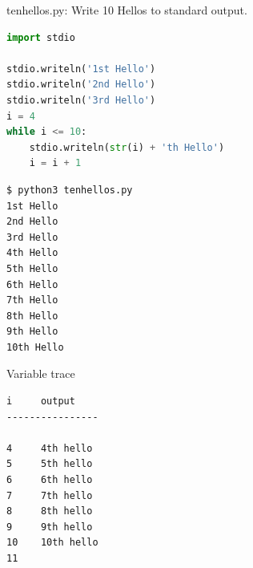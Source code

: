 \documentclass[8pt,a4paper,compress]{beamer}
\begin{document}
\begin{frame}[fragile]
\pause

\begin{framed}
\tiny tenhellos.py: Write 10 Hellos to standard output.
\end{framed}

\begin{lstlisting}[language=Python]
import stdio

stdio.writeln('1st Hello')
stdio.writeln('2nd Hello')
stdio.writeln('3rd Hello')
i = 4
while i <= 10:
    stdio.writeln(str(i) + 'th Hello')
    i = i + 1
\end{lstlisting}

\pause

\begin{minipage}{150pt}
\begin{lstlisting}[language={}]
$ python3 tenhellos.py 
1st Hello
2nd Hello
3rd Hello
4th Hello
5th Hello
6th Hello
7th Hello
8th Hello
9th Hello
10th Hello
\end{lstlisting}
\end{minipage}\hfill
\begin{minipage}{100pt}
Variable trace
\begin{lstlisting}[language={}]
i     output
----------------

4     4th hello
5     5th hello
6     6th hello
7     7th hello
8     8th hello
9     9th hello
10    10th hello
11
\end{lstlisting}
\end{minipage}
\end{frame}
\end{document}
